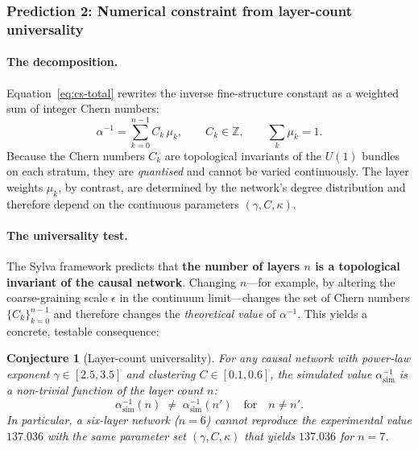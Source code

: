 \documentclass[11pt,a4paper]{article}
\newtheorem{conjecture}[theorem]{Conjecture}
\theoremstyle{definition}
\theoremstyle{remark}
\begin{document}
\subsubsection{Prediction 2: Numerical constraint from layer-count
universality}\label{subsubsec:prediction-layer-count}

\paragraph{The decomposition.}  Equation~\eqref{eq:cs-total} rewrites the
inverse fine-structure constant as a weighted sum of integer Chern numbers:
\begin{equation}\label{eq:decomposition}
\alpha^{-1} = \sum_{k=0}^{n-1} C_{k}\,\mu_{k},
\qquad C_{k}\in\mathbb{Z},
\qquad \sum_{k}\mu_{k}=1.
\end{equation}
Because the Chern numbers $C_{k}$ are topological invariants of the $U(1)$
bundles on each stratum, they are \emph{quantised} and cannot be varied
continuously.  The layer weights $\mu_{k}$, by contrast, are determined by
the network's degree distribution and therefore depend on the continuous
parameters $(\gamma, C, \kappa)$.

\paragraph{The universality test.}  The Sylva framework predicts that
\textbf{the number of layers $n$ is a topological invariant of the causal
network}.  Changing $n$---for example, by altering the coarse-graining scale
$\epsilon$ in the continuum limit---changes the set of Chern numbers
$\{C_{k}\}_{k=0}^{n-1}$ and therefore changes the \emph{theoretical value}
of $\alpha^{-1}$.  This yields a concrete, testable consequence:

\begin{conjecture}[Layer-count universality]\label{conj:layer-count}
For any causal network with power-law exponent $\gamma\in[2.5,3.5]$ and
clustering $C\in[0.1,0.6]$, the simulated value $\alpha^{-1}_{\text{sim}}$
is a \emph{non-trivial function} of the layer count $n$:
\begin{equation}\label{eq:alpha-vs-n}
\alpha^{-1}_{\text{sim}}(n) \;\neq\; \alpha^{-1}_{\text{sim}}(n')
\quad\text{for}\quad n\neq n'.
\end{equation}
In particular, a six-layer network ($n=6$) cannot reproduce the experimental
value $137.036$ with the same parameter set $(\gamma,C,\kappa)$ that yields
$137.036$ for $n=7$.
\end{conjecture}
\end{document}
